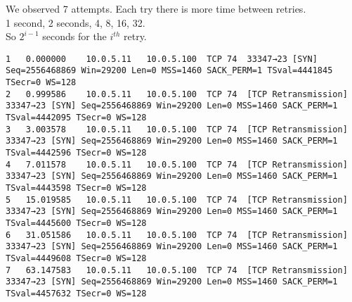 We observed 7 attempts. Each try there is more time between retries.\\
1 second, 2 seconds, 4, 8, 16, 32.\\
So $2^{i-1}$ seconds for the $i^{th}$ retry.


\begin{lstlisting}
1	0.000000	10.0.5.11	10.0.5.100	TCP	74	33347→23 [SYN] Seq=2556468869 Win=29200 Len=0 MSS=1460 SACK_PERM=1 TSval=4441845 TSecr=0 WS=128
2	0.999586	10.0.5.11	10.0.5.100	TCP	74	[TCP Retransmission] 33347→23 [SYN] Seq=2556468869 Win=29200 Len=0 MSS=1460 SACK_PERM=1 TSval=4442095 TSecr=0 WS=128
3	3.003578	10.0.5.11	10.0.5.100	TCP	74	[TCP Retransmission] 33347→23 [SYN] Seq=2556468869 Win=29200 Len=0 MSS=1460 SACK_PERM=1 TSval=4442596 TSecr=0 WS=128
4	7.011578	10.0.5.11	10.0.5.100	TCP	74	[TCP Retransmission] 33347→23 [SYN] Seq=2556468869 Win=29200 Len=0 MSS=1460 SACK_PERM=1 TSval=4443598 TSecr=0 WS=128
5	15.019585	10.0.5.11	10.0.5.100	TCP	74	[TCP Retransmission] 33347→23 [SYN] Seq=2556468869 Win=29200 Len=0 MSS=1460 SACK_PERM=1 TSval=4445600 TSecr=0 WS=128
6	31.051586	10.0.5.11	10.0.5.100	TCP	74	[TCP Retransmission] 33347→23 [SYN] Seq=2556468869 Win=29200 Len=0 MSS=1460 SACK_PERM=1 TSval=4449608 TSecr=0 WS=128
7	63.147583	10.0.5.11	10.0.5.100	TCP	74	[TCP Retransmission] 33347→23 [SYN] Seq=2556468869 Win=29200 Len=0 MSS=1460 SACK_PERM=1 TSval=4457632 TSecr=0 WS=128
\end{lstlisting}

